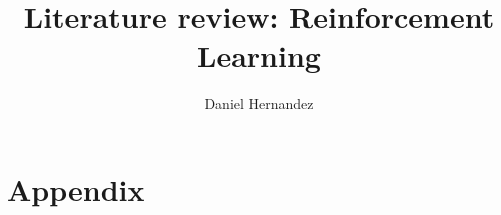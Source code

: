 \documentclass{article}
\title{\textbf{Literature review: Reinforcement Learning}}
\author{Daniel Hernandez}
\date{ }
\begin{document}
\maketitle


% 
% 
% 
%
% 
% 
% 
% 
% 

\section{Appendix}


\end{document}
